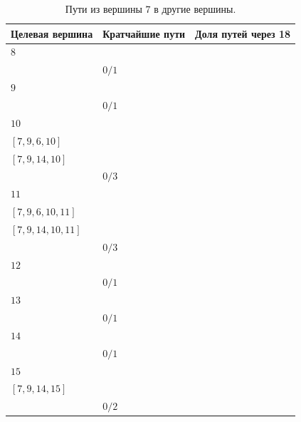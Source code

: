 \documentclass[12pt, a4paper]{extarticle}
\begin{document}
\begin{table}[h!]
    \caption{Пути из вершины $7$ в другие вершины.}
    \label{tbl:10-7}
    \begin{tabularx}{\textwidth}{|X|X|X|}
        \hline 
        Целевая вершина & Кратчайшие пути & Доля путей через 18 \\
        \hline 
        $8$ & \begin{tabular}{@{}l@{}} $[7, 8]$ \\ \end{tabular} & $0/1$ \\
        \hline
        $9$ & \begin{tabular}{@{}l@{}} $[7, 9]$ \\ \end{tabular} & $0/1$ \\
        \hline
        $10$ & \begin{tabular}{@{}l@{}} $[7, 3, 6, 10]$ \\  $[7, 9, 6, 10]$ \\  $[7, 9, 14, 10]$ \\ \end{tabular} & $0/3$ \\
        \hline
        $11$ & \begin{tabular}{@{}l@{}} $[7, 3, 6, 10, 11]$ \\  $[7, 9, 6, 10, 11]$ \\  $[7, 9, 14, 10, 11]$ \\ \end{tabular} & $0/3$ \\
        \hline
        $12$ & \begin{tabular}{@{}l@{}} $[7, 9, 13, 12]$ \\ \end{tabular} & $0/1$ \\
        \hline
        $13$ & \begin{tabular}{@{}l@{}} $[7, 9, 13]$ \\ \end{tabular} & $0/1$ \\
        \hline
        $14$ & \begin{tabular}{@{}l@{}} $[7, 9, 14]$ \\ \end{tabular} & $0/1$ \\
        \hline
        $15$ & \begin{tabular}{@{}l@{}} $[7, 9, 13, 15]$ \\  $[7, 9, 14, 15]$ \\ \end{tabular} & $0/2$ \\

\end{tabularx}
\end{table}
\end{document}
